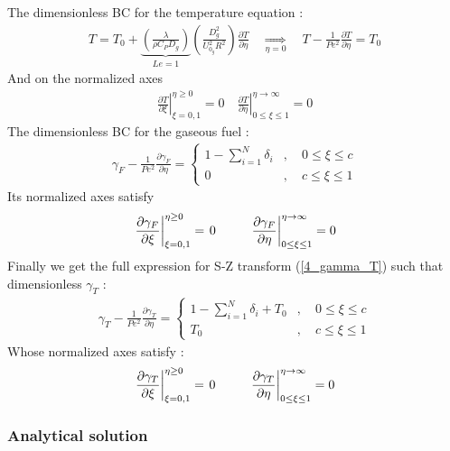 \documentclass[12pt]{article}
\newcommand\tab[1][1cm]{\hspace*{#1}}
\numberwithin{equation}{section}
\begin{document}
\begin{flushleft}
The dimensionless BC for the temperature equation :
\begin{align}
T=T_{0}+\underbrace{\left(\frac{\lambda}{\rho C_{P} D_{g}}\right)}_{L e=1}\left(\frac{D_{g}^{2}}{U_{0_{g}}^{2} R^{2}}\right) \frac{\partial T}{\partial \eta} \quad \underset{\eta=0}{\Rightarrow} \quad T-\frac{1}{P e^{2}} \frac{\partial T}{\partial \eta}=T_{0}
\end{align}
And on the normalized axes
\begin{align}
\left.\frac{\partial T}{\partial \xi}\right|_{\xi=0,1} ^{\eta \geq 0}=\left.0 \quad \frac{\partial T}{\partial \eta}\right|_{0 \leq \xi \leq 1} ^{\eta \rightarrow \infty}=0
\end{align}
The dimensionless BC for the gaseous fuel :
\begin{align}
\gamma_{F}-\frac{1}{P e^{2}} \frac{\partial \gamma_{F}}{\partial \eta}=\left\{\begin{array}{ll}
1-\sum_{i=1}^{N} \delta_{i} & , \quad 0 \leq \xi \leq c \\
0 & , \quad c \leq \xi \leq 1
\end{array}\right.
\end{align}
Its normalized axes satisfy
\begin{align}
\left.\frac{\partial \gamma_{F}}{\partial \xi}\right|_{\xi=0,1}^{\eta \geq 0}=\left.0 \tab\frac{\partial \gamma_{F}}{\partial \eta}\right|_{0 \leq \xi \leq 1} ^{\eta \rightarrow \infty}=0
\end{align}
Finally we get the full expression for S-Z transform (\ref{4_gamma_T}) such that dimensionless $\gamma_{T}$ :
\begin{align}
\gamma_{T}-\frac{1}{P e^{2}} \frac{\partial \gamma_{T}}{\partial \eta}=\left\{\begin{array}{ll}
1-\sum_{i=1}^{N} \delta_{i}+T_{0} & , \quad 0 \leq \xi \leq c \\
T_{0} & , \quad c \leq \xi \leq 1
\end{array}\right. \label{4_SZ_trans}
\end{align}
Whose normalized axes satisfy :
\begin{align}
\left.\frac{\partial \gamma_{T}}{\partial \xi}\right|_{\xi=0,1} ^{\eta \geq 0}=\left.0 \tab \frac{\partial \gamma_{T}}{\partial \eta}\right|_{0 \leq \xi \leq 1} ^{\eta \rightarrow \infty}=0 \label{4_gamma_axes}
\end{align}

\subsubsection{Analytical solution}


\end{flushleft}
\end{document}
